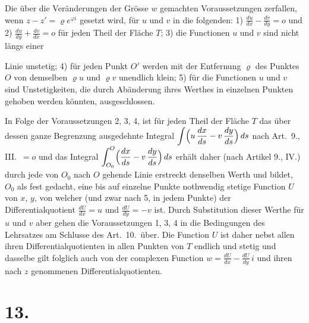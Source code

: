 \documentclass{article}
\begin{document}
Die über die Veränderungen der Grösse $w$ gemachten Voraussetzungen zerfallen, wenn $z - z' = \varrho e^{\varphi i}$ gesetzt wird, für $u$ und $v$ in die folgenden: 1) $\frac{du}{dx} - \frac{dv}{dy} = o$ und 2) $\frac{du}{dy} + \frac{dv}{dx} = o$ für jeden Theil der Fläche $T$; 3) die Functionen $u$ und $v$ sind nicht längs einer

Linie unstetig; 4) für jeden Punkt $O'$ werden mit der Entfernung $\varrho$ des Punktes $O$ von demselben $\varrho u$ und $\varrho v$ unendlich klein; 5) für die Functionen $u$ und $v$ sind Unstetigkeiten, die durch Abänderung ihres Werthes in einzelnen Punkten gehoben werden könnten, ausgeschlossen.

In Folge der Voraussetzungen 2, 3, 4, ist für jeden Theil der Fläche $T$ das über dessen ganze Begrenzung ausgedehnte Integral $\displaystyle\int \Bigl(u\,\frac{dx}{ds} - v\,\frac{dy}{ds}\Bigr)\,ds$ nach Art.~9., III.\ $= o$ und das Integral $\displaystyle\int_{O_0}^O \Bigl(\frac{dx}{ds} - v\,\frac{dy}{ds}\Bigr)\,ds$ erhält daher (nach Artikel 9., IV.) durch jede von $O_0$ nach $O$ gehende Linie erstreckt denselben Werth und bildet, $O_0$ als fest gedacht, eine bis auf einzelne Punkte nothwendig stetige Function $U$ von $x$, $y$, von welcher (und zwar nach 5, in jedem Punkte) der Differentialquotient $\frac{dU}{dx} = u$ und $\frac{dU}{dy} = -v$ ist. Durch Substitution dieser Werthe für $u$ und $v$ aber gehen die Voraussetzungen 1, 3, 4 in die Bedingungen des Lehrsatzes am Schlusse des Art.~10.\ über. Die Function $U$ ist daher nebst allen ihren Differentialquotienten in allen Punkten von $T$ endlich und stetig und dasselbe gilt folglich auch von der complexen Function $w = \frac{dU}{dx} - \frac{dU}{dy}\,i$ und ihren nach $z$ genommenen Differentialquotienten.

\section*{13.}
\end{document}
